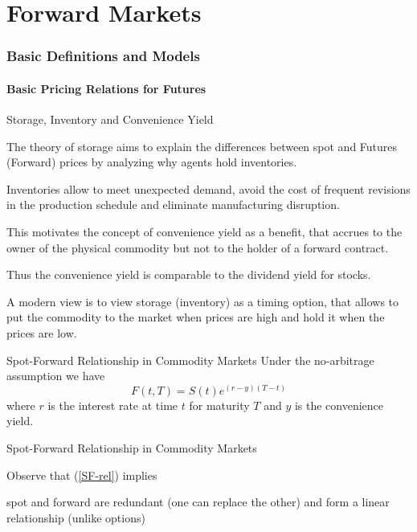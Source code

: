 \part{Forward Markets}
\section{Basic Definitions and Models}
\subsection{Basic Pricing Relations for Futures}

{Storage, Inventory and Convenience Yield}






	The theory of storage aims to explain the differences between spot
and Futures (Forward) prices by analyzing why agents hold inventories.


	Inventories
allow to meet unexpected demand, avoid the cost of frequent revisions in
the production schedule and eliminate manufacturing disruption.


	This
motivates the concept of convenience yield as a benefit, that accrues to the
owner of the physical commodity but not to the holder of a forward contract.


	Thus the convenience yield is comparable to the dividend yield for stocks.


	A modern view is to view storage (inventory) as a timing option, that
allows to put the commodity to the market when prices are high
and hold it when the prices are low.





{Spot-Forward Relationship in Commodity Markets }
Under the no-arbitrage assumption we have
\begin{equation}\label{SF-rel}
F(t,T)=S(t)e^{(r-y)(T-t)}
\end{equation}
where $r$ is the interest rate at time $t$ for maturity $T$ and $y$ is the convenience yield.

{Spot-Forward Relationship in Commodity Markets }

Observe that (\ref{SF-rel}) implies






	spot and forward are redundant (one can replace the other) and form a
linear relationship (unlike options)


